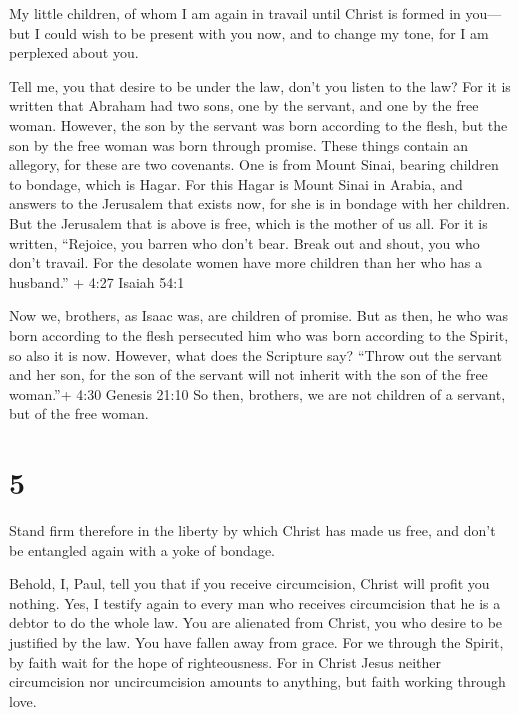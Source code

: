  My little children, of whom I am again in travail until
Christ is formed in you---  but I could wish to be present
with you now, and to change my tone, for I am perplexed about you.

 Tell me, you that desire to be under the law, don't you
listen to the law?  For it is written that Abraham had two
sons, one by the servant, and one by the free woman. 
However, the son by the servant was born according to the flesh, but the
son by the free woman was born through promise.  These
things contain an allegory, for these are two covenants. One is from
Mount Sinai, bearing children to bondage, which is Hagar. 
For this Hagar is Mount Sinai in Arabia, and answers to the Jerusalem
that exists now, for she is in bondage with her children. 
But the Jerusalem that is above is free, which is the mother of us all.
 For it is written, ``Rejoice, you barren who don't bear.
Break out and shout, you who don't travail. For the desolate women have
more children than her who has a husband.'' + 4:27 Isaiah 54:1

 Now we, brothers, as Isaac was, are children of promise.
 But as then, he who was born according to the flesh
persecuted him who was born according to the Spirit, so also it is now.
 However, what does the Scripture say? ``Throw out the
servant and her son, for the son of the servant will not inherit with
the son of the free woman.''+ 4:30 Genesis 21:10  So then,
brothers, we are not children of a servant, but of the free woman.

\hypertarget{section-4}{%
\section{5}\label{section-4}}

 Stand firm therefore in the liberty by which Christ has
made us free, and don't be entangled again with a yoke of bondage.

 Behold, I, Paul, tell you that if you receive circumcision,
Christ will profit you nothing.  Yes, I testify again to
every man who receives circumcision that he is a debtor to do the whole
law.  You are alienated from Christ, you who desire to be
justified by the law. You have fallen away from grace.  For
we through the Spirit, by faith wait for the hope of righteousness.
 For in Christ Jesus neither circumcision nor uncircumcision
amounts to anything, but faith working through love.

